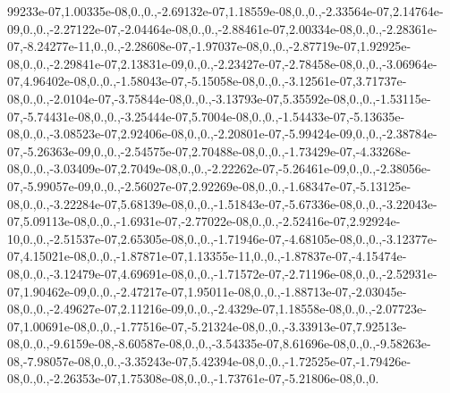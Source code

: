 {99233e-\/07,1.\-00335e-\/08,0.,0.,-\/2.\-69132e-\/07,1.\-18559e-\/08,0.,0.,-\/2.\-33564e-\/07,2.\-14764e-\/09,0.,0.,-\/2.\-27122e-\/07,-\/2.\-04464e-\/08,0.,0.,-\/2.\-88461e-\/07,2.\-00334e-\/08,0.,0.,-\/2.\-28361e-\/07,-\/8.\-24277e-\/11,0.,0.,-\/2.\-28608e-\/07,-\/1.\-97037e-\/08,0.,0.,-\/2.\-87719e-\/07,1.\-92925e-\/08,0.,0.,-\/2.\-29841e-\/07,2.\-13831e-\/09,0.,0.,-\/2.\-23427e-\/07,-\/2.\-78458e-\/08,0.,0.,-\/3.\-06964e-\/07,4.\-96402e-\/08,0.,0.,-\/1.\-58043e-\/07,-\/5.\-15058e-\/08,0.,0.,-\/3.\-12561e-\/07,3.\-71737e-\/08,0.,0.,-\/2.\-0104e-\/07,-\/3.\-75844e-\/08,0.,0.,-\/3.\-13793e-\/07,5.\-35592e-\/08,0.,0.,-\/1.\-53115e-\/07,-\/5.\-74431e-\/08,0.,0.,-\/3.\-25444e-\/07,5.\-7004e-\/08,0.,0.,-\/1.\-54433e-\/07,-\/5.\-13635e-\/08,0.,0.,-\/3.\-08523e-\/07,2.\-92406e-\/08,0.,0.,-\/2.\-20801e-\/07,-\/5.\-99424e-\/09,0.,0.,-\/2.\-38784e-\/07,-\/5.\-26363e-\/09,0.,0.,-\/2.\-54575e-\/07,2.\-70488e-\/08,0.,0.,-\/1.\-73429e-\/07,-\/4.\-33268e-\/08,0.,0.,-\/3.\-03409e-\/07,2.\-7049e-\/08,0.,0.,-\/2.\-22262e-\/07,-\/5.\-26461e-\/09,0.,0.,-\/2.\-38056e-\/07,-\/5.\-99057e-\/09,0.,0.,-\/2.\-56027e-\/07,2.\-92269e-\/08,0.,0.,-\/1.\-68347e-\/07,-\/5.\-13125e-\/08,0.,0.,-\/3.\-22284e-\/07,5.\-68139e-\/08,0.,0.,-\/1.\-51843e-\/07,-\/5.\-67336e-\/08,0.,0.,-\/3.\-22043e-\/07,5.\-09113e-\/08,0.,0.,-\/1.\-6931e-\/07,-\/2.\-77022e-\/08,0.,0.,-\/2.\-52416e-\/07,2.\-92924e-\/10,0.,0.,-\/2.\-51537e-\/07,2.\-65305e-\/08,0.,0.,-\/1.\-71946e-\/07,-\/4.\-68105e-\/08,0.,0.,-\/3.\-12377e-\/07,4.\-15021e-\/08,0.,0.,-\/1.\-87871e-\/07,1.\-13355e-\/11,0.,0.,-\/1.\-87837e-\/07,-\/4.\-15474e-\/08,0.,0.,-\/3.\-12479e-\/07,4.\-69691e-\/08,0.,0.,-\/1.\-71572e-\/07,-\/2.\-71196e-\/08,0.,0.,-\/2.\-52931e-\/07,1.\-90462e-\/09,0.,0.,-\/2.\-47217e-\/07,1.\-95011e-\/08,0.,0.,-\/1.\-88713e-\/07,-\/2.\-03045e-\/08,0.,0.,-\/2.\-49627e-\/07,2.\-11216e-\/09,0.,0.,-\/2.\-4329e-\/07,1.\-18558e-\/08,0.,0.,-\/2.\-07723e-\/07,1.\-00691e-\/08,0.,0.,-\/1.\-77516e-\/07,-\/5.\-21324e-\/08,0.,0.,-\/3.\-33913e-\/07,7.\-92513e-\/08,0.,0.,-\/9.\-6159e-\/08,-\/8.\-60587e-\/08,0.,0.,-\/3.\-54335e-\/07,8.\-61696e-\/08,0.,0.,-\/9.\-58263e-\/08,-\/7.\-98057e-\/08,0.,0.,-\/3.\-35243e-\/07,5.\-42394e-\/08,0.,0.,-\/1.\-72525e-\/07,-\/1.\-79426e-\/08,0.,0.,-\/2.\-26353e-\/07,1.\-75308e-\/08,0.,0.,-\/1.\-73761e-\/07,-\/5.\-21806e-\/08,0.,0.}
